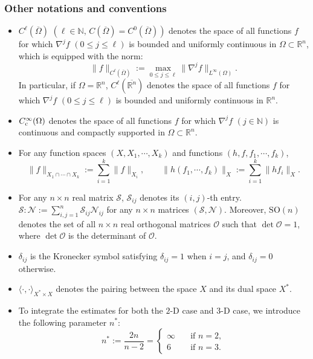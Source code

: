 \documentclass[11pt,reqno]{amsart}
\numberwithin{rk}{section}
\numberwithin{prop}{section}
\numberwithin{mydef}{section}
\numberwithin{lem}{section}
\numberwithin{equation}{section}
\numberwithin{thm}{section}
\begin{document}
\subsubsection{Other notations and conventions}\label{othernote}
\begin{itemize}\smallskip
\item $C^\ell(\overline\Omega)$ $(\ell\in \mathbb{N},\,C(\overline\Omega)=C^0(\overline\Omega))$ 
denotes the space of all functions $f$ for which $\nabla^j f$ $(0\leq j\leq \ell)$ is bounded and uniformly continuous in $\Omega\subset \mathbb{R}^n$, which is equipped with the norm:
\begin{equation*}
\|f\|_{C^\ell(\overline{\Omega})}:= \max_{0\leq j\leq \ell}\|\nabla^j f\|_{L^\infty(\Omega)}.
\end{equation*}
In particular, if $\Omega=\mathbb{R}^n$, $C^\ell(\overline{\mathbb{R}^n})$ denotes the space of all functions $f$ for which $\nabla^j f$ $(0\leq j\leq \ell)$ is bounded and uniformly continuous in $\mathbb{R}^n$.

\smallskip
\item $C^\infty_{\rm c}(\Omega)$ denotes the space of all functions $f$ for which $\nabla^j f$ $(j\in \mathbb{N})$ is continuous and compactly supported in $\Omega\subset \mathbb{R}^n$.

\smallskip
\item For any function spaces $(X,X_1,\cdots\!,X_k)$ and functions $(h,f,f_1,\cdots\!,f_k)$,
\begin{equation*}
\|f\|_{X_1\cap\cdots\cap X_k}:=\sum_{i=1}^k\|f\|_{X_i},\qquad \|h(f_1,\cdots\!,f_k)\|_{X}:=\sum_{i=1}^k\|hf_i\|_X.
\end{equation*}

\smallskip
\item For any $n\times n$ real matrix $\mathcal{S}$, $\mathcal{S}_{ij}$ denotes its $(i,j)$-th entry. $\mathcal{S}:\mathcal{N}:=\sum_{i,j=1}^n \mathcal{S}_{ij}\mathcal{N}_{ij}$ for any $n\times n$ matrices $(\mathcal{S},\mathcal{N})$.  Moreover, $\mathrm{SO}(n)$  denotes the set of all $n\times n$ real orthogonal matrices $\mathcal{O}$ such that $\det \mathcal{O}=1$, where $\det \mathcal{O}$ is the determinant of $\mathcal{O}$.

\smallskip
\item $\delta_{ij}$  is the Kronecker symbol satisfying $\delta_{ij} =1$ when $i = j$, 
and $\delta_{ij} =0$ otherwise.

\smallskip
\item $\langle\cdot,\cdot\rangle_{X^*\times X}$ denotes the pairing between the space $X$ and its dual space $X^*$. 
\smallskip

\item To integrate the estimates for both the $2$-D case and $3$-D case, we introduce the following parameter $n^*$:
\begin{equation*} 
n^*:=\frac{2n}{n-2}=\begin{cases}
\infty&\quad \text{if $n=2$},\\
6&\quad \text{if $n=3$}.
\end{cases}
\end{equation*}
\end{itemize}
\end{document}

